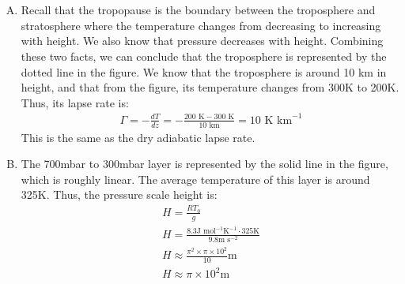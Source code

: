 \documentclass[11pt,a4paper,margin=1in]{article}
\begin{document}
\section{}
\begin{enumerate}[A.]
\item
    Recall that the tropopause is the boundary between the troposphere and 
    stratosphere where the temperature changes from decreasing to increasing
    with height. We also know that pressure decreases with height. Combining
    these two facts, we can conclude that the troposphere is represented by the
    dotted line in the figure. We know that the troposphere is around 10 km in
    height, and that from the figure, its temperature changes from 300K to 200K.
    Thus, its lapse rate is:
    \begin{gather*}
        \Gamma = -\frac{dT}{dz} = -\frac{200\text{ K} - 300 \text{ K}}
            {10\text{ km}} = 10 \text{ K km}^{-1}
    \end{gather*}
    This is the same as the dry adiabatic lapse rate.
\item
    The 700mbar to 300mbar layer is represented by the solid line in the figure,
    which is roughly linear. The average temperature of this layer is around 325K.
    Thus, the pressure scale height is:
    \begin{gather*}
        H = \frac{RT_0}{g}\\
        H = \frac{8.3 \text{J mol}^{-1} \text{K}^{-1} \cdot 325 \text{K}}
            {9.8 \text{m s}^{-2}}\\
        H \approx \frac{\pi^2 \times \pi \times 10^2}{10} \text{m}\\
        H \approx \pi \times 10^2 \text{m} 
    \end{gather*}
\end{enumerate}
\end{document}
